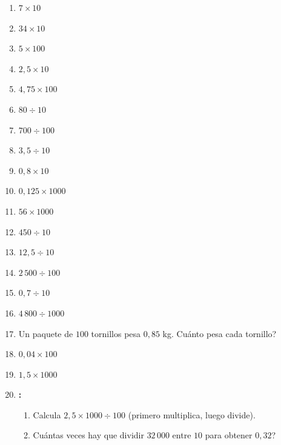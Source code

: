 \documentclass[12pt, letterpaper]{article}
\begin{document}
\begin{enumerate}[leftmargin=*, start=65]
  \item \facil{} $7 \times 10$

  \item \facil{} $34 \times 10$

  \item \facil{} $5 \times 100$

  \item \facil{} $2{,}5 \times 10$

  \item \facil{} $4{,}75 \times 100$

  \item \facil{} $80 \div 10$

  \item \facil{} $700 \div 100$

  \item \facil{} $3{,}5 \div 10$

  \item \medio{} $0{,}8 \times 10$

  \item \medio{} $0{,}125 \times 1000$

  \item \medio{} $56 \times 1000$

  \item \medio{} $450 \div 10$

  \item \medio{} $12{,}5 \div 10$

  \item \medio{} $2\,500 \div 100$

  \item \medio{} $0{,}7 \div 10$

  \item \medio{} $4\,800 \div 1000$

  \item \medio{} Un paquete de $100$ tornillos pesa $0{,}85$ kg. \textquestiondown Cuánto pesa cada tornillo?

  \item \dificil{} $0{,}04 \times 100$

  \item \dificil{} $1{,}5 \times 1000$

  \item \dificil{} \textbf{:}
        \begin{enumerate}[label=\alph*)]
          \item Calcula $2{,}5 \times 1000 \div 100$ (primero multiplica, luego divide).
          \item \textquestiondown Cuántas veces hay que dividir $32\,000$ entre $10$ para obtener $0{,}32$?
        \end{enumerate}
\end{enumerate}
\end{document}
